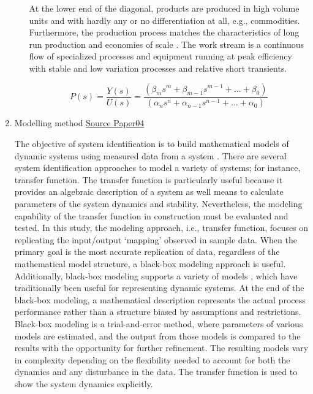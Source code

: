 \documentclass{article}
\begin{document}
\begin{enumerate}
\begin{enumerate}
At the lower end of the diagonal, products are produced in high volume units and with hardly any or no differentiation at all, e.g., commodities.
Furthermore, the production process matches the characteristics of long run production \citep[p.154]{Baye2010} and economies of scale \citep[p.185]{Baye2010}.
The work stream is a continuous flow of specialized processes and equipment running at peak efficiency with stable and low variation processes \citep[pp.8-10]{Hopp2001} and relative short transients.


\begin{equation}\label{eq:Productivity_Function}
	P(s) = \frac{Y(s)}{U(s)} =
	\frac{(\beta_m s^m + \beta_{m-1} s^{m-1}+\ldots+\beta_0)}{(\alpha_n s^n + \alpha_{n-1} s^{n-1}+\ldots+\alpha_0)}
\end{equation}
\end{enumerate}

\item Modelling method
\label{sec:org718f28d}
\uline{Source Paper04}

The objective of system identification is to build mathematical models of dynamic systems using measured data from a system \citep{Ljung1999}.
There are several system identification approaches to model a variety of systems; for instance, transfer function.
The transfer function is particularly useful because it provides an algebraic description of a system as well means to calculate parameters of the system dynamics and stability.
Nevertheless, the modeling capability of the transfer function in construction must be evaluated and tested.
In this study, the modeling approach, i.e., transfer function, focuses on replicating the input/output `mapping' observed in sample data.
When the primary goal is the most accurate replication of data, regardless of the mathematical model structure, a black-box modeling approach is useful.
Additionally, black-box modeling supports a variety of models \citep{Bapat2011, Billings2013}, which have traditionally been useful for representing dynamic systems.
At the end of the black-box modeling, a mathematical description represents the actual process performance rather than a structure biased by assumptions and restrictions.
Black-box modeling is a trial-and-error method, where parameters of various models are estimated, and the output from those models is compared to the results with the opportunity for further refinement.
The resulting models vary in complexity depending on the flexibility needed to account for both the dynamics and any disturbance in the data.
The transfer function is used to show the system dynamics explicitly.


\end{enumerate}
\end{document}

